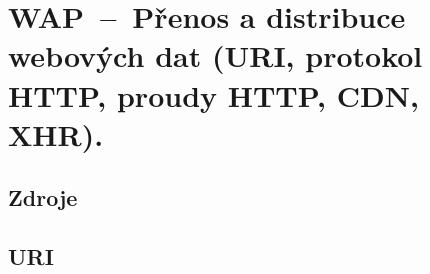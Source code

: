 

\graphicspath{{wap/udalosti_v_javascriptu/figures}}


\chapter{WAP~--~Přenos a distribuce webových dat (URI, protokol HTTP, proudy HTTP, CDN, XHR).}


\section{Zdroje}

\begin{compactitem}
    \item {}
    \item {}
    \item {}
\end{compactitem}


\section{URI}

